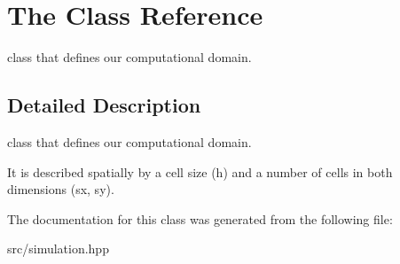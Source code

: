 \hypertarget{classThe}{}\section{The Class Reference}
\label{classThe}


class that defines our computational domain.  




\subsection{Detailed Description}
class that defines our computational domain. 

It is described spatially by a cell size (h) and a number of cells in both dimensions (sx, sy). 

The documentation for this class was generated from the following file\+:\begin{DoxyCompactItemize}
\item 
src/simulation.\+hpp\end{DoxyCompactItemize}
